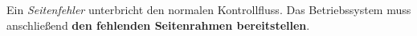 Ein \emph{Seitenfehler} unterbricht den normalen Kontrollfluss.
Das Betriebssystem muss anschließend \textbf{den fehlenden Seitenrahmen
bereitstellen}.
